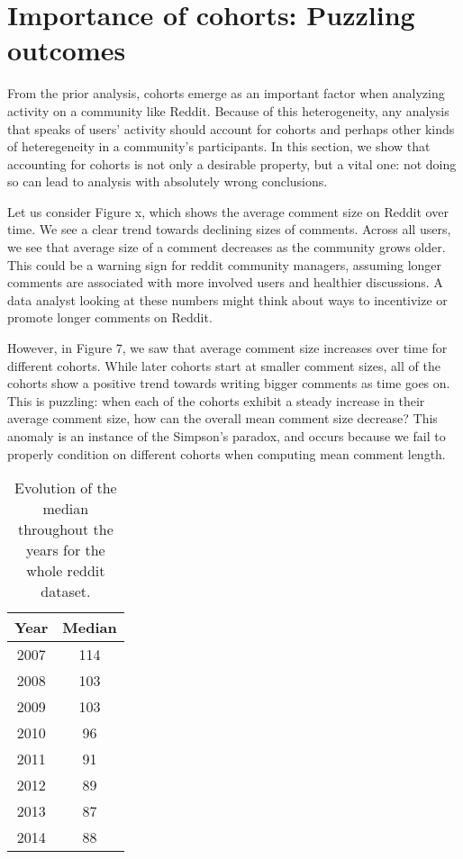 \section{Importance of cohorts: Puzzling outcomes}
From the prior analysis, cohorts emerge as an important factor when analyzing activity on a community like Reddit. Because of this heterogeneity, any analysis that speaks of users' activity should account for cohorts and perhaps other kinds of heteregeneity in a community's participants. In this section, we show that accounting for cohorts is not only a desirable property, but a vital one: not doing so can lead to analysis with absolutely wrong conclusions. 

Let us consider Figure x, which shows the average comment size on Reddit over time. We see a clear trend towards declining sizes of comments. Across all users, we see that average size of a comment decreases as the community grows older. This could be a warning sign for reddit community managers, assuming longer comments are associated with more involved users and healthier discussions. A data analyst looking at these numbers might think about ways to incentivize or promote longer comments on Reddit. 

However, in Figure 7, we saw that average comment size increases over time for different cohorts. While later cohorts start at smaller comment sizes, all of the cohorts show a positive trend towards writing bigger comments as time goes on. This is puzzling: when each of the cohorts exhibit a steady increase in their average comment size, how can the overall mean comment size decrease? This anomaly is an instance of the Simpson's paradox, and occurs because we fail to properly condition on different cohorts when computing mean comment length. 

\begin{table}
\centering
\begin{tabular}{|c|c|}
\hline
Year & Median \\ \hline
2007 & 114 \\ \hline
2008 & 103 \\ \hline
2009 & 103 \\ \hline
2010 & 96 \\ \hline
2011 & 91 \\ \hline
2012 & 89 \\ \hline
2013 & 87 \\ \hline
2014 & 88 \\ \hline
\end{tabular}
\caption{Evolution of the median throughout the years for the whole reddit dataset.}
\end{table}

